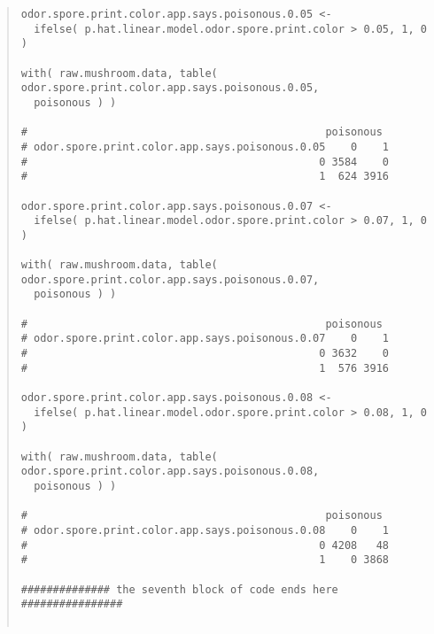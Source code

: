 \documentclass[12pt]{article}
\begin{document}
\begin{quote}
\begin{verbatim}
odor.spore.print.color.app.says.poisonous.0.05 <- 
  ifelse( p.hat.linear.model.odor.spore.print.color > 0.05, 1, 0 )

with( raw.mushroom.data, table( odor.spore.print.color.app.says.poisonous.0.05, 
  poisonous ) )

#                                               poisonous
# odor.spore.print.color.app.says.poisonous.0.05    0    1
#                                              0 3584    0
#                                              1  624 3916

odor.spore.print.color.app.says.poisonous.0.07 <- 
  ifelse( p.hat.linear.model.odor.spore.print.color > 0.07, 1, 0 )

with( raw.mushroom.data, table( odor.spore.print.color.app.says.poisonous.0.07, 
  poisonous ) )

#                                               poisonous
# odor.spore.print.color.app.says.poisonous.0.07    0    1
#                                              0 3632    0
#                                              1  576 3916

odor.spore.print.color.app.says.poisonous.0.08 <- 
  ifelse( p.hat.linear.model.odor.spore.print.color > 0.08, 1, 0 )

with( raw.mushroom.data, table( odor.spore.print.color.app.says.poisonous.0.08, 
  poisonous ) )

#                                               poisonous
# odor.spore.print.color.app.says.poisonous.0.08    0    1
#                                              0 4208   48
#                                              1    0 3868

############## the seventh block of code ends here ################


\end{verbatim}

\end{quote}
\end{document}
